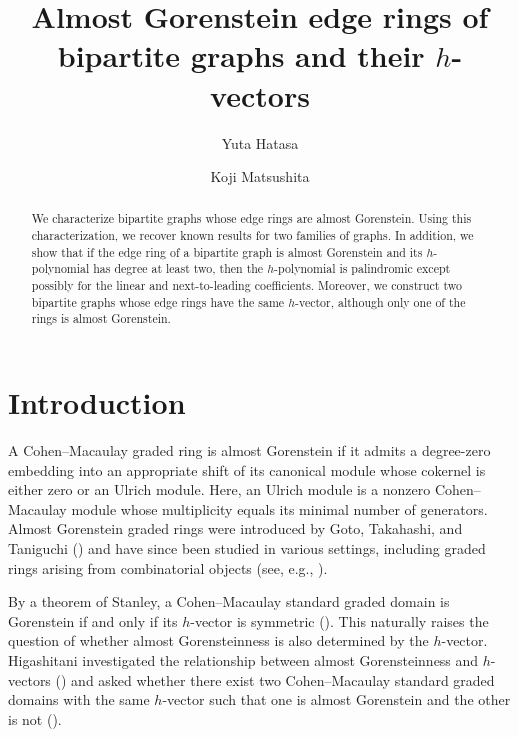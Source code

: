 \documentclass[a4paper,reqno,11pt]{amsart}
\theoremstyle{definition}
\theoremstyle{remark}
\numberwithin{equation}{section}
\begin{document}
\title{Almost Gorenstein edge rings of bipartite graphs and their $h$-vectors}
\author{Yuta Hatasa}
\address[Y. Hatasa]{Independent Researcher, Japan}
\author{Koji Matsushita}
\address[K. Matsushita]{Graduate School of Mathematical Sciences, The University of Tokyo, Komaba, Meguro-ku, Tokyo 153-8914, Japan}

\begin{abstract}
    We characterize bipartite graphs whose edge rings are almost Gorenstein.
    Using this characterization, we recover known results for two families of graphs.
    In addition, we show that if the edge ring of a bipartite graph is almost Gorenstein and its $h$-polynomial has degree at least two, then the $h$-polynomial is palindromic except possibly for the linear and next-to-leading coefficients.
    Moreover, we construct two bipartite graphs whose edge rings have the same $h$-vector, although only one of the rings is almost Gorenstein.
\end{abstract}

\maketitle

\section{Introduction}

A Cohen--Macaulay graded ring is almost Gorenstein if it admits a degree-zero embedding into an appropriate shift of its canonical module whose cokernel is either zero or an Ulrich module.
Here,
an Ulrich module is a nonzero Cohen--Macaulay module whose multiplicity equals its minimal number of generators.
Almost Gorenstein graded rings were introduced by Goto, Takahashi, and Taniguchi (\cite{goto2015almost}) and have since been studied in various settings, including
graded rings arising from combinatorial objects (see, e.g., \cite{matsuoka2016uniformly,miyazaki2018hibi,miyazaki2023stable}).

By a theorem of Stanley, a Cohen--Macaulay standard graded domain is Gorenstein if and only if its $h$-vector is symmetric (\cite[Theorem~4.4]{stanley1978hilbert}).
This naturally raises the question of whether almost Gorensteinness is also determined by the $h$-vector.
Higashitani investigated the relationship between almost Gorensteinness and $h$-vectors (\cite{higashitani2016almost}) and asked whether there exist two Cohen--Macaulay standard graded domains with the same $h$-vector such that one is almost Gorenstein and the other is not (\cite[Problem~4.6]{higashitani2016almost}).
\end{document}
